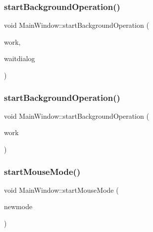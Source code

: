 \mbox{\label{class_main_window_a998d615ee6326496799ccd038a11205d}} 
\subsubsection{\texorpdfstring{startBackgroundOperation()}{startBackgroundOperation()}\hspace{0.1cm}{\footnotesize\ttfamily [1/2]}}
{\footnotesize\ttfamily void Main\+Window\+::start\+Background\+Operation (\begin{DoxyParamCaption}\item[{\mbox{\hyperlink{class_background_worker}{Background\+Worker}} $\ast$}]{work,  }\item[{\mbox{\hyperlink{class_wait_dialog}{Wait\+Dialog}} $\ast$}]{waitdialog }\end{DoxyParamCaption})\hspace{0.3cm}{\ttfamily [protected]}}

\mbox{\label{class_main_window_a8801e3a135bddb640a647b698d7adb5c}} 
\subsubsection{\texorpdfstring{startBackgroundOperation()}{startBackgroundOperation()}\hspace{0.1cm}{\footnotesize\ttfamily [2/2]}}
{\footnotesize\ttfamily void Main\+Window\+::start\+Background\+Operation (\begin{DoxyParamCaption}\item[{\mbox{\hyperlink{class_background_worker_with_wait_dialog}{Background\+Worker\+With\+Wait\+Dialog}} $\ast$}]{work }\end{DoxyParamCaption})\hspace{0.3cm}{\ttfamily [protected]}}

\mbox{\label{class_main_window_a146371a952a9a6509a88a84d80e49818}} 
\subsubsection{\texorpdfstring{startMouseMode()}{startMouseMode()}}
{\footnotesize\ttfamily void Main\+Window\+::start\+Mouse\+Mode (\begin{DoxyParamCaption}\item[{\mbox{\hyperlink{class_mouse_mode}{Mouse\+Mode}} $\ast$}]{newmode }\end{DoxyParamCaption})\hspace{0.3cm}{\ttfamily [protected]}}

